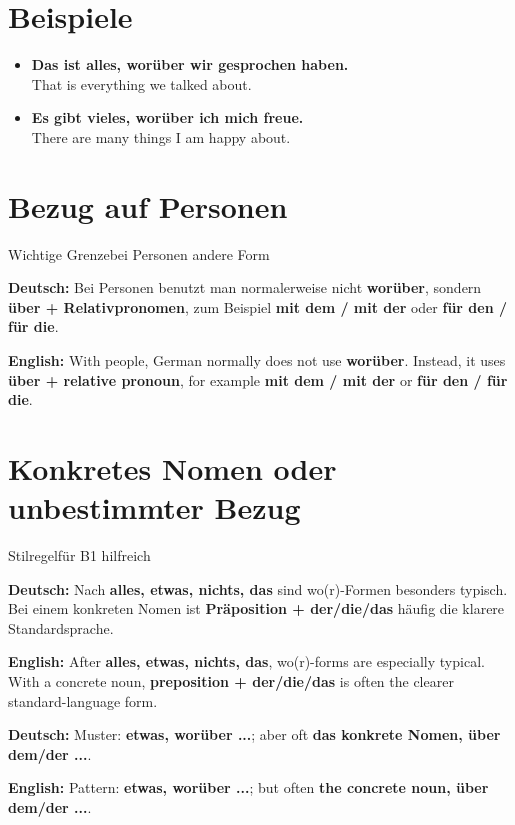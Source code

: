 \documentclass[a4paper,11pt]{article}
\newcommand{\GermanText}[1]{\textbf{Deutsch: }#1\par}
\newcommand{\EnglishText}[1]{{\small\color{SoftGray}\textbf{English: }#1\par}}
\newcommand{\ExampleItem}[2]{\item \textbf{#1}\\{\small\color{SoftGray}#2}}
\begin{document}
\section{Beispiele}

\begin{exbox}

\begin{itemize}

\ExampleItem{Das ist alles, worüber wir gesprochen haben.}{That is everything we talked about.}

\ExampleItem{Es gibt vieles, worüber ich mich freue.}{There are many things I am happy about.}

\end{itemize}

\end{exbox}

\section{Bezug auf Personen}

\begin{grammarentry}{Wichtige Grenze}{bei Personen andere Form}

\GermanText{Bei Personen benutzt man normalerweise nicht \textbf{worüber}, sondern \textbf{über + Relativpronomen}, zum Beispiel \textbf{mit dem / mit der} oder \textbf{für den / für die}.}

\EnglishText{With people, German normally does not use \textbf{worüber}. Instead, it uses \textbf{über + relative pronoun}, for example \textbf{mit dem / mit der} or \textbf{für den / für die}.}

\end{grammarentry}

\section{Konkretes Nomen oder unbestimmter Bezug}

\begin{grammarentry}{Stilregel}{für B1 hilfreich}

\GermanText{Nach \textbf{alles, etwas, nichts, das} sind wo(r)-Formen besonders typisch. Bei einem konkreten Nomen ist \textbf{Präposition + der/die/das} häufig die klarere Standardsprache.}

\EnglishText{After \textbf{alles, etwas, nichts, das}, wo(r)-forms are especially typical. With a concrete noun, \textbf{preposition + der/die/das} is often the clearer standard-language form.}

\GermanText{Muster: \textbf{etwas, worüber ...}; aber oft \textbf{das konkrete Nomen, über dem/der ...}.}

\EnglishText{Pattern: \textbf{etwas, worüber ...}; but often \textbf{the concrete noun, über dem/der ...}.}

\end{grammarentry}
\end{document}
